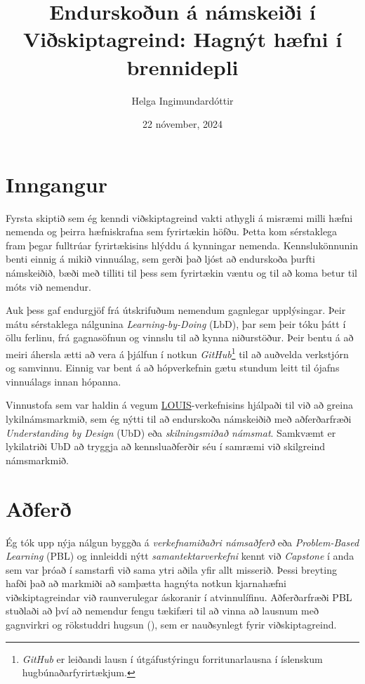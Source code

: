 \documentclass{kennsluakademia_conf}
\date{22 nóvember, 2024}
\title{Endurskoðun á námskeiði í Viðskiptagreind: Hagnýt hæfni í
brennidepli}
\author{%
Helga Ingimundardóttir\autid{}{0000-0002-2780-3546}%
}
\affil{}{Iðnaðarverkfræðideild, Háskóli Íslands}
\begin{document}
\maketitle


\section{Inngangur}\label{inngangur}

Fyrsta skiptið sem ég kenndi viðskiptagreind vakti athygli á misræmi
milli hæfni nemenda og þeirra hæfniskrafna sem fyrirtækin höfðu. Þetta
kom sérstaklega fram þegar fulltrúar fyrirtækisins hlýddu á kynningar
nemenda. Kennslukönnunin benti einnig á mikið vinnuálag, sem gerði það
ljóst að endurskoða þurfti námskeiðið, bæði með tilliti til þess sem
fyrirtækin væntu og til að koma betur til móts við nemendur.

Auk þess gaf endurgjöf frá útskrifuðum nemendum gagnlegar upplýsingar.
Þeir mátu sérstaklega nálgunina \emph{Learning-by-Doing} (LbD), þar sem
þeir tóku þátt í öllu ferlinu, frá gagnasöfnun og vinnslu til að kynna
niðurstöður. Þeir bentu á að meiri áhersla ætti að vera á þjálfun í
notkun \emph{GitHub}\footnote{\emph{GitHub} er leiðandi lausn í
  útgáfustýringu forritunarlausna í íslenskum hugbúnaðarfyrirtækjum.}
til að auðvelda verkstjórn og samvinnu. Einnig var bent á að
hópverkefnin gætu stundum leitt til ójafns vinnuálags innan hópanna.

Vinnustofa sem var haldin á vegum
\href{https://aurora-universities.eu/louis/}{LOUIS}-verkefnisins
hjálpaði til við að greina lykilnámsmarkmið, sem ég nýtti til að
endurskoða námskeiðið með aðferðarfræði \emph{Understanding by Design}
(UbD) eða \emph{skilningsmiðað námsmat}. Samkvæmt
\citet{wiggins2005understanding} er lykilatriði UbD að tryggja að
kennsluaðferðir séu í samræmi við skilgreind námsmarkmið.

\section{Aðferð}\label{auxf0feruxf0}

Ég tók upp nýja nálgun byggða á \emph{verkefnamiðaðri námsaðferð} eða
\emph{Problem-Based Learning} (PBL) og innleiddi nýtt
\emph{samantektarverkefni} kennt við \emph{Capstone} í anda
\citet{capstone} sem var þróað í samstarfi við sama ytri aðila yfir allt
misserið. Þessi breyting hafði það að markmiði að samþætta hagnýta
notkun kjarnahæfni viðskiptagreindar við raunverulegar áskoranir í
atvinnulífinu. Aðferðarfræði PBL stuðlaði að því að nemendur fengu
tækifæri til að vinna að lausnum með gagnvirkri og rökstuddri hugsun
(\citet{barrows1980problem}), sem er nauðsynlegt fyrir viðskiptagreind.
\end{document}
